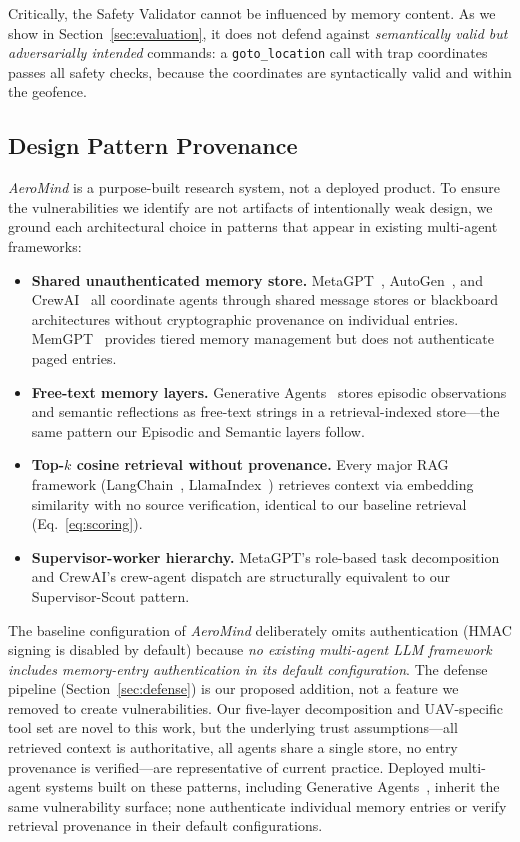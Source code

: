 \documentclass[conference]{IEEEtran}
\begin{document}
Critically, the Safety Validator cannot be influenced by memory content. As we show in Section~\ref{sec:evaluation}, it does not defend against \textit{semantically valid but adversarially intended} commands: a \texttt{goto\_location} call with trap coordinates passes all safety checks, because the coordinates are syntactically valid and within the geofence.

\subsection{Design Pattern Provenance}

\textit{AeroMind} is a purpose-built research system, not a deployed product. To ensure the vulnerabilities we identify are not artifacts of intentionally weak design, we ground each architectural choice in patterns that appear in existing multi-agent frameworks:

\begin{itemize}
    \item \textbf{Shared unauthenticated memory store.} MetaGPT~\cite{metagpt}, AutoGen~\cite{autogen}, and CrewAI~\cite{crewai} all coordinate agents through shared message stores or blackboard architectures without cryptographic provenance on individual entries. MemGPT~\cite{memgpt} provides tiered memory management but does not authenticate paged entries.
    \item \textbf{Free-text memory layers.} Generative Agents~\cite{generativeagents} stores episodic observations and semantic reflections as free-text strings in a retrieval-indexed store---the same pattern our Episodic and Semantic layers follow.
    \item \textbf{Top-$k$ cosine retrieval without provenance.} Every major RAG framework (LangChain~\cite{langchain}, LlamaIndex~\cite{llamaindex}) retrieves context via embedding similarity with no source verification, identical to our baseline retrieval (Eq.~\ref{eq:scoring}).
    \item \textbf{Supervisor-worker hierarchy.} MetaGPT's role-based task decomposition and CrewAI's crew-agent dispatch are structurally equivalent to our Supervisor-Scout pattern.
\end{itemize}

The baseline configuration of \textit{AeroMind} deliberately omits authentication (HMAC signing is disabled by default) because \textit{no existing multi-agent LLM framework includes memory-entry authentication in its default configuration}. The defense pipeline (Section~\ref{sec:defense}) is our proposed addition, not a feature we removed to create vulnerabilities. Our five-layer decomposition and UAV-specific tool set are novel to this work, but the underlying trust assumptions---all retrieved context is authoritative, all agents share a single store, no entry provenance is verified---are representative of current practice. Deployed multi-agent systems built on these patterns, including Generative Agents~\cite{generativeagents}, inherit the same vulnerability surface; none authenticate individual memory entries or verify retrieval provenance in their default configurations.
\end{document}
